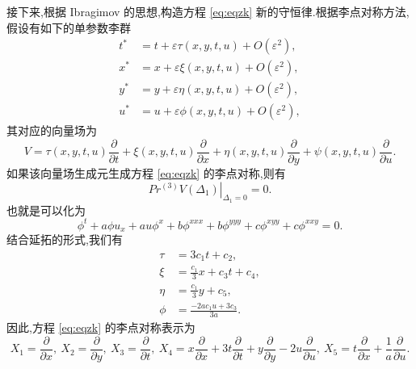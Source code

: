 接下来,根据 Ibragimov \cite{wazwaz2012soli,yan2009per} 的思想,构造方程 \eqref{eq:eqzk} 新的守恒律.根据李点对称方法,假设有如下的单参数李群
\begin{equation*}
	\begin{aligned}
		t^*&=t+\varepsilon \tau(x,y,t,u)+O(\varepsilon^2),\\
		x^*&=x+\varepsilon \xi(x,y,t,u)+O(\varepsilon^2),\\
		y^*&=y+\varepsilon \eta(x,y,t,u)+O(\varepsilon^2),\\
		u^*&=u+\varepsilon \phi(x,y,t,u)+O(\varepsilon^2),
	\end{aligned}
\end{equation*}
其对应的向量场为
\begin{equation*}
	V=\tau(x,y,t,u)\frac{\partial}{\partial t}+\xi(x,y,t,u)\frac{\partial}{\partial x}+\eta(x,y,t,u)\frac{\partial}{\partial y}+\psi(x,y,t,u)\frac{\partial}{\partial u}.
\end{equation*}
如果该向量场生成元生成方程 \eqref{eq:eqzk} 的李点对称,则有
\begin{equation*}
	\left. Pr^{(3)}V(\Delta_1)\right|_{\Delta_1=0}=0.
\end{equation*}
也就是可以化为
\begin{equation*}
	\phi^t+a\phi u_x + au\phi^x + b\phi^{xxx} + b\phi^{yyy}+c\phi^{xyy}+c\phi^{xxy}=0.
\end{equation*}
结合延拓的形式,我们有
\begin{equation*}
	\begin{aligned}
		\tau&=3c_1t+c_2,\\
		\xi&=\frac{c_1}{3}x+c_3t+c_4,\\
		\eta&=\frac{c_1}{3}y+c_5,\\
		\phi&=\frac{-2ac_1u+3c_3}{3a}.
	\end{aligned}
\end{equation*}
因此,方程 \eqref{eq:eqzk} 的李点对称表示为 \cite{wang2014soli}
\begin{equation*}
	X_{1}=\frac{\partial}{\partial x},~X_{2}=\frac{\partial}{\partial y},~X_{3}=\frac{\partial}{\partial t},~X_{4}=x\frac{\partial}{\partial x}+3t\frac{\partial}{\partial t}+y\frac{\partial}{\partial y}-2u\frac{\partial}{\partial u}, ~X_{5}=t\frac{\partial}{\partial x}+\frac{1}{a}\frac{\partial}{\partial u}.
\end{equation*}

